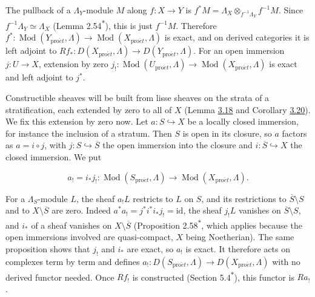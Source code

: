 \documentclass[11pt]{article}
\newcommand{\bpout}[1]{#1\textsuperscript{\hyperlink{bp-outside}{\ensuremath{\ast}}}}
\begin{document}
The pullback of a \(\Lambda_Y\)-module \(M\) along \(f:X\to Y\) is \(f^*M=\Lambda_X\otimes_{f^{-1}\Lambda_Y}f^{-1}M\). Since \(f^{-1}\Lambda_Y\simeq\Lambda_X\) (Lemma \bpout{2.54}), this is just \(f^{-1}M\). Therefore \(f^*:\operatorname{Mod}(Y_{\mathrm{pro}\acute{e}t},\Lambda)\to
\operatorname{Mod}(X_{\mathrm{pro}\acute{e}t},\Lambda)\) is exact, and on derived categories it is left adjoint to \(Rf_*:D(X_{\mathrm{pro}\acute{e}t},\Lambda)\to
D(Y_{\mathrm{pro}\acute{e}t},\Lambda)\). For an open immersion \(j:U\to X\), extension by zero \(j_!:\operatorname{Mod}(U_{\mathrm{pro}\acute{e}t},\Lambda)\to\operatorname{Mod}(X_{\mathrm{pro}\acute{e}t},\Lambda)\) is exact and left adjoint to \(j^*\).

Constructible sheaves will be built from lisse sheaves on the strata of a stratification, each extended by zero to all of \(X\) (Lemma \hyperref[bp56]{3.18} and Corollary \hyperref[bp61]{3.20}). We fix this extension by zero now. Let \(a:S\hookrightarrow X\) be a locally closed immersion, for instance the inclusion of a stratum. Then \(S\) is open in its closure, so \(a\) factors as \(a=i\circ j\), with \(j:S\hookrightarrow\overline S\) the open immersion into the closure and \(i:\overline S\hookrightarrow X\) the closed immersion. We put

\[
a_!=i_*j_!:\operatorname{Mod}(S_{\mathrm{pro}\acute{e}t},\Lambda)\longrightarrow\operatorname{Mod}(X_{\mathrm{pro}\acute{e}t},\Lambda).
\]

For a \(\Lambda_S\)-module \(L\), the sheaf \(a_!L\) restricts to \(L\) on \(S\), and its restrictions to \(\overline S\setminus S\) and to \(X\setminus\overline S\) are zero. Indeed \(a^*a_!=j^*i^*i_*j_!=\mathrm{id}\), the sheaf \(j_!L\) vanishes on \(\overline S\setminus S\), and \(i_*\) of a sheaf vanishes on \(X\setminus\overline S\) (Proposition \bpout{2.58}, which applies because the open immersions involved are quasi-compact, \(X\) being Noetherian). The same proposition shows that \(j_!\) and \(i_*\) are exact, so \(a_!\) is exact. It therefore acts on complexes term by term and defines \(a_!:D(S_{\mathrm{pro}\acute{e}t},\Lambda)\to D(X_{\mathrm{pro}\acute{e}t},\Lambda)\) with no derived functor needed. Once \(Rf_!\) is constructed (Section \bpout{5.4}), this functor is \(Ra_!\).


\end{document}
